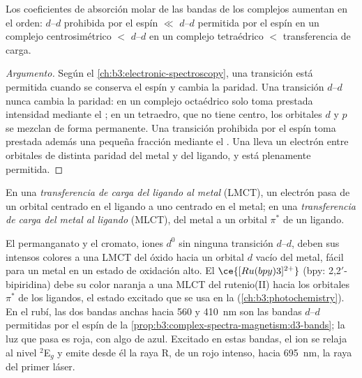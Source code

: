 \begin{proposition}\label{prop:b3:complex-spectra-magnetism:intensity-order}
Los coeficientes de absorción molar de las bandas de los complejos aumentan en el
orden: $d$--$d$ prohibida por el espín $\ll$ $d$--$d$ permitida por el espín en un complejo centrosimétrico $<$ $d$--$d$
en un complejo tetraédrico $<$ transferencia de carga.
\end{proposition}

\begin{proof}[Argumento]
Según el \cref{ch:b3:electronic-spectroscopy}, una transición está permitida cuando se conserva el
espín y cambia la paridad. Una transición $d$--$d$ nunca cambia la paridad: en un complejo
octaédrico solo toma prestada intensidad mediante el ; en un
tetraedro, que no tiene centro, los orbitales $d$ y $p$ se mezclan de forma permanente. Una
transición prohibida por el espín toma prestada además una pequeña fracción mediante el . Una  lleva un electrón entre orbitales de
distinta paridad del metal y del ligando, y está plenamente permitida.
\end{proof}

\begin{definition}\label{def:b3:complex-spectra-magnetism:ct}
En una \emph{transferencia de carga del ligando al metal}
(LMCT), un electrón pasa de un orbital centrado en el ligando a uno centrado en el
metal; en una \emph{transferencia de carga del metal al ligando}
(MLCT), del metal a un orbital $\pi^*$ de un ligando.
\end{definition}

El permanganato y el cromato, iones $d^0$ sin ninguna transición $d$--$d$, deben sus intensos
colores a una LMCT del óxido hacia un orbital $d$ vacío del metal, fácil para un metal en un estado
de oxidación alto. El $\ce{[Ru(bpy)3]^{2+}}$ (bpy: 2,2$'$-bipiridina) debe su color naranja a una MLCT
del rutenio(II) hacia los orbitales $\pi^*$ de los ligandos, el estado excitado que se usa en la
 (\cref{ch:b3:photochemistry}). En el rubí, las dos bandas anchas
hacia 560 y \qty{410}{nm} son las bandas $d$--$d$ permitidas por el espín de la
\cref{prop:b3:complex-spectra-magnetism:d3-bands}; la luz que pasa es roja,
con algo de azul. Excitado en estas bandas, el ion se relaja al nivel $^2$E$_g$ y
emite desde él la raya R, de un rojo intenso, hacia \qty{695}{nm}, la raya del primer láser.


